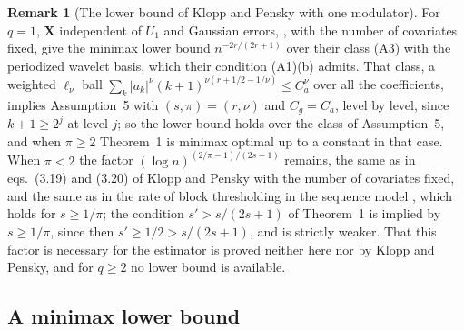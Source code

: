 \documentclass[10pt]{book}
\theoremstyle{definition}
\newtheorem*{remarkold}{Remark}   %
\newcommand{\lev}{j}
\newcommand{\bX}{\mathbf{X}}
\newcommand{\seff}{s'}
\newcommand{\removedk}{\par\noindent[removed in k = 4]\par}
\begin{document}
{%
{\color{gray}\removedk
\begin{remarkold}[The lower bound of Klopp and Pensky with one modulator]
For $q = 1$, $\bX$ independent of $U_1$ and Gaussian errors,
\citet[Theorem~1, eqs.~3.6 and 3.7]{Klopp-Pensky-2015}, with the number of
covariates fixed, give the minimax lower bound $n^{-2r/(2r+1)}$ over their
class (A3) with the periodized wavelet basis, which their condition (A1)(b)
admits. That class, a weighted $\ell_\nu$ ball
$\sum_{k}|a_{k}|^{\nu}(k+1)^{\nu(r+1/2-1/\nu)} \le C_a^{\nu}$ over all the
coefficients, implies Assumption~5 with $(s,\pi) = (r,\nu)$ and $C_g = C_a$,
level by level, since $k+1 \ge 2^{\lev}$ at level $\lev$; so the lower bound
holds over the class of Assumption~5, and when $\pi \ge 2$ Theorem~1 is minimax
optimal up to a constant in that case. When $\pi < 2$ the factor
$(\log n)^{(2/\pi-1)/(2s+1)}$ remains, the same as in eqs.~(3.19) and (3.20)
of Klopp and Pensky with the number of covariates fixed, and the same as in
the rate of block thresholding in the sequence model
\citep[Theorem~4, eq.~5.4]{Cai-1999}, which holds for $s \ge 1/\pi$; the
condition $\seff > s/(2s+1)$ of Theorem~1 is implied by $s \ge 1/\pi$, since
then $\seff \ge 1/2 > s/(2s+1)$, and is strictly weaker. That this factor is
necessary for the estimator is proved neither here nor by Klopp and Pensky,
and for $q \ge 2$ no lower bound is available.
\end{remarkold}
}

\subsection*{A minimax lower bound}

}
\end{document}
